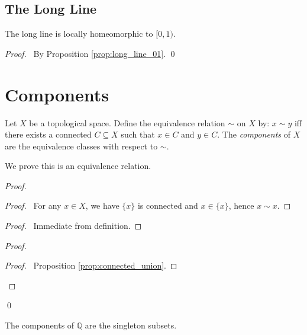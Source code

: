 \subsection{The Long Line}

\begin{prop}
The long line is locally homeomorphic to $[0,1)$.
\end{prop}

\begin{proof}
\pf\ By Proposition \ref{prop:long_line_01}. \qed
\end{proof}

\section{Components}

\begin{df}
Let $X$ be a topological space. Define the equivalence relation $\sim$ on $X$ by: $x \sim y$ iff there exists a connected $C \subseteq X$ such that $x \in C$ and $y \in C$. The \emph{components} of $X$ are the equivalence classes with respect to $\sim$.

We prove this is an equivalence relation.
\end{df}

\begin{proof}
\pf
{}
\begin{proof}
	\pf\ For any $x \in X$, we have $\{x\}$ is connected and $x \in \{x\}$, hence $x \sim x$.
\end{proof}
\begin{proof}
	\pf\ Immediate from definition.
\end{proof}
\begin{proof}
	\begin{proof}
		\pf\ Proposition \ref{prop:connected_union}.
	\end{proof}
\end{proof}
\qed
\end{proof}

\begin{ex}
The components of $\mathbb{Q}$ are the singleton subsets.
\end{ex}

